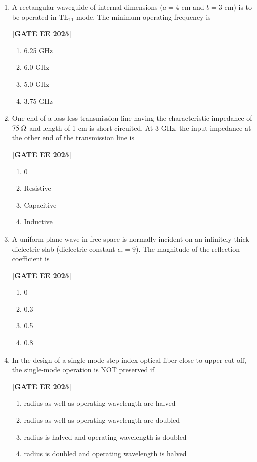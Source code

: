 \documentclass[12pt]{article}
\begin{document}
\begin{enumerate}[leftmargin=*, label=\textbf{Q.\arabic*:}]
\item A rectangular waveguide of internal dimensions ($a=4$ cm and $b=3$ cm) is to be operated in $\mathrm{TE}_{11}$ mode. The minimum operating frequency is
 
\noindent \textbf{[GATE EE 2025]}
\begin{enumerate}
  \item 6.25 GHz
  \item 6.0 GHz
  \item 5.0 GHz
  \item 3.75 GHz
\end{enumerate}

\item One end of a loss-less transmission line having the characteristic impedance of $75\;\ohm$ and length of 1 cm is short-circuited. At 3 GHz, the input impedance at the other end of the transmission line is
 
\noindent \textbf{[GATE EE 2025]}
\begin{enumerate}
  \item 0
  \item Resistive
  \item Capacitive
  \item Inductive
\end{enumerate}

\item A uniform plane wave in free space is normally incident on an infinitely thick dielectric slab (dielectric constant $\epsilon_r = 9$). The magnitude of the reflection coefficient is
 
\noindent \textbf{[GATE EE 2025]}
\begin{enumerate}
  \item 0
  \item 0.3
  \item 0.5
  \item 0.8
\end{enumerate}

\item In the design of a single mode step index optical fiber close to upper cut-off, the single-mode operation is NOT preserved if
 
\noindent \textbf{[GATE EE 2025]}
\begin{enumerate}
  \item radius as well as operating wavelength are halved
  \item radius as well as operating wavelength are doubled
  \item radius is halved and operating wavelength is doubled
  \item radius is doubled and operating wavelength is halved
\end{enumerate}


\end{enumerate}
\end{document}
